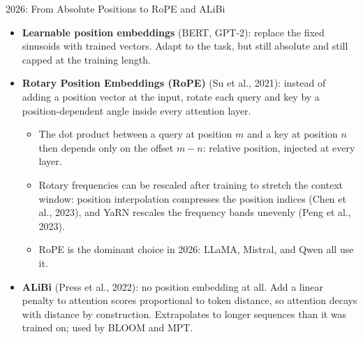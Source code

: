 \begin{frame}{2026: From Absolute Positions to RoPE and ALiBi}
  \begin{itemize}
    \item[\textcolor{red}{$\blacktriangleright$}] \textbf{Learnable position embeddings} (BERT, GPT-2): replace the fixed sinusoids with trained vectors. Adapt to the task, but still absolute and still capped at the training length.
    \vspace{0.4em}
    \item[\textcolor{red}{$\blacktriangleright$}] \textbf{Rotary Position Embeddings (RoPE)} (Su et al., 2021): instead of adding a position vector at the input, rotate each query and key by a position-dependent angle inside every attention layer.
    \begin{itemize}
      \item The dot product between a query at position $m$ and a key at position $n$ then depends only on the offset $m-n$: relative position, injected at every layer.
      \item Rotary frequencies can be rescaled after training to stretch the context window: position interpolation compresses the position indices (Chen et al., 2023), and YaRN rescales the frequency bands unevenly (Peng et al., 2023).
      \item RoPE is the dominant choice in 2026: LLaMA, Mistral, and Qwen all use it.
    \end{itemize}
    \vspace{0.4em}
    \item[\textcolor{red}{$\blacktriangleright$}] \textbf{ALiBi} (Press et al., 2022): no position embedding at all. Add a linear penalty to attention scores proportional to token distance, so attention decays with distance by construction. Extrapolates to longer sequences than it was trained on; used by BLOOM and MPT.
  \end{itemize}
\end{frame}
